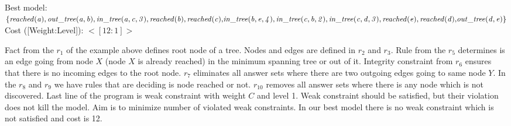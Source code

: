 \documentclass[14pt,a4paper, titlepage]{article}
\begin{document}
Best model: $\mathit{\{reached(a), out\_tree(a,b), 
in\_tree(a,c,3), reached(b), reached(c),}\\ \mathit{ 
in\_tree(b,e,4), in\_tree(c,b,2), in\_tree(c,d,3), 
reached(e), reached(d),} \\ \mathit{  out\_tree(d,e)\}}$
\\Cost ([Weight:Level]): $<[12:1]>$

Fact from the $r_1$ of the example above defines root node 
of a tree. Nodes and edges are defined in $r_2$ and $r_3$. 
Rule from the $r_5$ determines is an edge going from node 
$X$ (node $X$ is already reached) in the minimum spanning 
tree or out of it. Integrity constraint from $r_6$ ensures 
that there is no incoming edges to the root node. $r_7$ 
eliminates all answer sets where there are two outgoing 
edges going to same node $Y$. In the $r_{8}$ and $r_{9}$ 
we have rules that are deciding is node reached or not. 
$r_{10}$ removes all answer sets where there is any node 
which is not discovered. Last line of the program is weak 
constraint with weight $C$ and level 1. Weak constraint 
should be satisfied, but their violation does not kill the 
model. Aim is to minimize number of violated weak 
constraints. In our best model there is no weak constraint 
which is not satisfied and cost is 12.  
\end{document}
